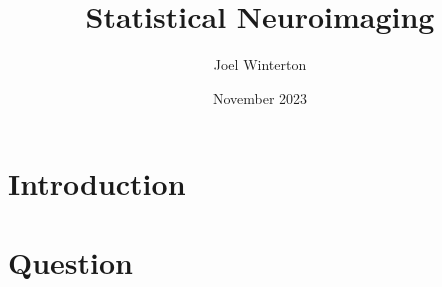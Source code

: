 \documentclass{report}
\title{Statistical Neuroimaging}
\author{Joel Winterton}
\date{November 2023}
\begin{document}
\maketitle
\tableofcontents
\chapter{Introduction}
\chapter{Question}
\end{document}
